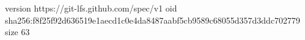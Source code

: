 version https://git-lfs.github.com/spec/v1
oid sha256:f8f25f92d636519e1aecd1c0e4da8487aabf5cb9589c68055d357d3ddc702779
size 63
